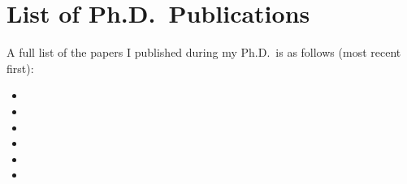 \section*{List of Ph.D.\ Publications}
A full list of the papers I published during my Ph.D.\ is as follows (most recent first):
\begin{itemize}
	\item {}
	\item {}
	\item {}
	\item {}
	\item {}
	\item {}
\end{itemize}
